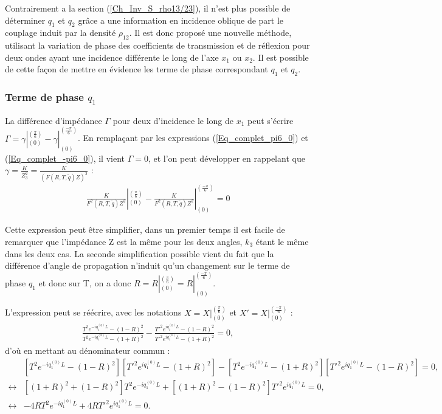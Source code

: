 \documentclass[12pt]{report}
\begin{document}
    Contrairement a la section (\ref{Ch_Inv_S_rho13/23}), il n'est plus possible de déterminer $q_1$ et $q_2$ grâce a une information en incidence oblique de part le couplage induit par la densité $\rho_{12}$. Il est donc proposé une nouvelle méthode, utilisant la variation de phase des coefficients de transmission et de réflexion  pour deux ondes ayant une incidence différente le long de l'axe $x_1$ ou $x_2$. Il est possible de cette façon de mettre en évidence les terme de phase correspondant $q_1$ et $q_2$.
    
\subsubsection*{Terme de phase $q_1$}
	La différence d'impédance $\Gamma$ pour deux d'incidence le long de $x_1$ peut s'écrire $\Gamma=\gamma|^{(\frac{\pi}{6})}_{(0)}-\gamma|^{(\frac{-\pi}{6})}_{(0)}$.
	En remplaçant par les expressions (\ref{Eq_complet_pi6_0}) et (\ref{Eq_complet_-pi6_0}), il vient $\Gamma=0$, et l'on peut développer en rappelant que $\gamma=\frac{K}{Z_3^2}=\frac{K}{(F(R,T,\tilde{q})Z)^2}$ :
    \begin{align*}
    \frac{K}{F^2(R,T,\tilde{q})Z^2}|^{(\frac{\pi}{6})}_{(0)}-\frac{K}{F^2(R,T,\tilde{q})Z^2}|^{(\frac{-\pi}{6})}_{(0)}=0
    \end{align*}
    
    Cette expression peut être simplifier, dans un premier temps il est facile de remarquer que l'impédance Z est la même pour les deux angles, $k_3$ étant le même dans les deux cas. La seconde simplification possible vient du fait que la différence d'angle de propagation n'induit qu'un changement sur le terme de phase $q_1$ et donc sur T, on a donc $R=R|^{(\frac{\pi}{6})}_{(0)}=R|^{(\frac{-\pi}{6})}_{(0)}$. 
	
    L'expression peut se réécrire, avec les notations $X=X|^{(\frac{\pi}{6})}_{(0)}$ et $X'=X|^{(\frac{-\pi}{6})}_{(0)}$ :
    \begin{align*}
    \frac{T^2e^{-iq_1^{(0)}L}-(1-R)^2}{T^2e^{-iq_1^{(0)}L}-(1+R)^2}-\frac{T'^2e^{iq_1^{(0)}L}-(1-R)^2}{T'^2e^{iq_1^{(0)}L}-(1+R)^2}=0,
    \end{align*}
    d'où en mettant au dénominateur commun :
    \begin{align*}
    &[T^2e^{-iq_1^{(0)}L}-(1-R)^2][T'^2e^{iq_1^{(0)}L}-(1+R)^2]-[T^2e^{-iq_1^{(0)}L}-(1+R)^2][T'^2e^{iq_1^{(0)}L}-(1-R)^2]=0,\\
    \leftrightarrow & [(1+R)^2+(1-R)^2]T^2e^{-iq_1^{(0)}L}+[(1+R)^2-(1-R)^2]T'^2e^{iq_1^{(0)}L}=0,\\
    \leftrightarrow & -4RT^2e^{-iq_1^{(0)}L}+4RT'^2e^{iq_1^{(0)}L}=0. 
    \end{align*}
    
\end{document}
